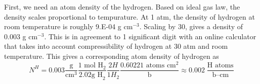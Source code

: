 \documentclass[12pt]{article}
\newenvironment{solnum}[2][Solution]{\begin{trivlist}
\item[\hskip \labelsep {\bfseries #1}\hskip \labelsep {\bfseries #2:}]\hspace{0.3in}\newline\newline}{\end{trivlist}}
\begin{document}
\begin{solnum}{2}

First, we need an atom density of the hydrogen.  Based on ideal gas law, the density
scales proportional to tempurature.  At 1 atm, the density of hydrogen at room
temperature is roughly 9.E-04 g cm$^{-3}$.  Scaling by 30, gives a density of 0.003
g cm$^{-3}$.  This is in agreement to 1 significant digit with an online calculator that takes into account
compressibility of hydrogen at 30 atm and room temperature.  This gives a
corresponding atom density of hydrogen as
\begin{equation}
    N^{H} = 0.003 \frac{\text{g}}{\text{cm}^3}\frac{1\text{ mol H}_2}{2.02\text {g
    H}_2}\frac{2 H}{1 H_2}\frac{0.60221\text{ atoms cm}^2}{\text{b}} \approx
    0.002\;\frac{\text{H atoms}}{\text{b--cm}}
\end{equation}


\end{solnum}
\end{document}
